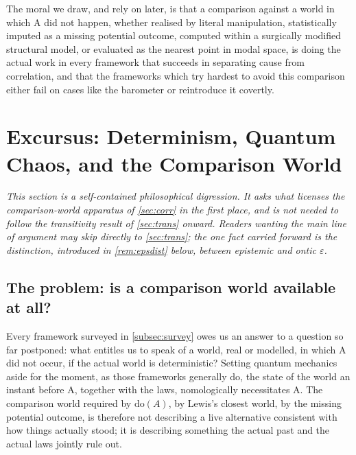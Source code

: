 \documentclass[11pt]{article}
\theoremstyle{definition}
\newenvironment{skipnote}
  {\par\smallskip\noindent\itshape\small}
  {\par\smallskip\noindent}
\newcommand{\eps}{\varepsilon}
\begin{document}
The moral we draw, and rely on later, is that a comparison against a world in which A did not happen, whether realised by literal manipulation, statistically imputed as a missing potential outcome, computed within a surgically modified structural model, or evaluated as the nearest point in modal space, is doing the actual work in every framework that succeeds in separating cause from correlation, and that the frameworks which try hardest to avoid this comparison either fail on cases like the barometer or reintroduce it covertly.

\section{Excursus: Determinism, Quantum Chaos, and the Comparison World}
\label{sec:excursus}

\begin{skipnote}
This section is a self-contained philosophical digression. It asks what licenses the comparison-world apparatus of \cref{sec:corr} in the first place, and is not needed to follow the transitivity result of \cref{sec:trans} onward. Readers wanting the main line of argument may skip directly to \cref{sec:trans}; the one fact carried forward is the distinction, introduced in \cref{rem:epsdist} below, between \emph{epistemic} and \emph{ontic} $\eps$.
\end{skipnote}

\subsection{The problem: is a comparison world available at all?}
\label{subsec:determinism-problem}

Every framework surveyed in \cref{subsec:survey} owes us an answer to a question so far postponed: what entitles us to speak of a world, real or modelled, in which A did not occur, if the actual world is deterministic? Setting quantum mechanics aside for the moment, as those frameworks generally do, the state of the world an instant before A, together with the laws, nomologically necessitates A. The comparison world required by $\mathrm{do}(A)$, by Lewis's closest world, by the missing potential outcome, is therefore not describing a live alternative consistent with how things actually stood; it is describing something the actual past and the actual laws jointly rule out.
\end{document}
